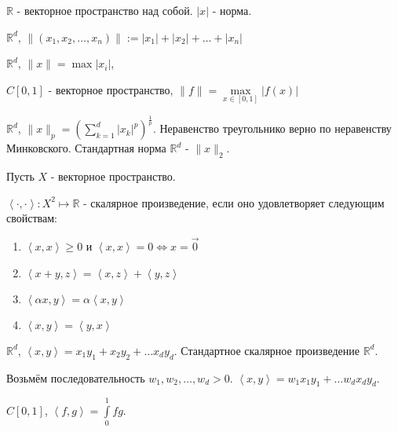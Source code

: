 \begin{example} \thmslashn

    $\mathbb{R}$ - векторное пространство над собой. $|x|$ - норма.

    $\mathbb{R}^{d}$, $\| (x_1, x_2, \ldots, x_{n})\| := |x_1| + |x_2| + \ldots + |x_n|$ 

    $\mathbb{R}^{d}$, $\|x\| = \max |x_{i}|$,

    $C[0, 1]$ - векторное пространство, $\|f\| = \max\limits_{x\in [0, 1]} |f(x)|$

    $\mathbb{R}^{d}$, $\| x \|_{p} = \left(\sum\limits_{k=1}^{d} |x_{k}|^{p}\right)^{\frac{1}{p}}$. Неравенство треугольнико верно по неравенству Минковского. Стандартная норма $\mathbb{R}^{d}$ - $\|x\|_{2}$.
\end{example}
\begin{definition} \thmslashn 

    Пусть $X$ - векторное пространство.

    $\left<\cdot , \cdot \right> : X^2 \mapsto \mathbb{R}$ - скалярное произведение, если оно удовлетворяет следующим свойствам:

    \begin{enumerate}
        \item $\left<x, x\right> \ge 0$ и $\left<x, x\right> = 0 \iff x = \vec{0}$
        \item $\left<x+y, z\right> = \left<x, z\right> + \left<y, z\right>$ 
        \item $\left<\alpha x, y\right> = \alpha\left<x, y\right>$
        \item $\left<x, y\right> = \left<y, x\right>$
    \end{enumerate}
\end{definition}
\begin{example} \thmslashn

    $\mathbb{R}^{d}$, $\left<x, y\right> = x_1y_1 + x_2y_2 + \ldots x_{d}y_{d}$. Стандартное скалярное произведение $\mathbb{R}^{d}$.

    Возьмём последовательность $w_1, w_2, \ldots, w_{d} > 0$. $\left<x, y\right> = w_1x_1y_1 + \ldots w_{d}x_{d}y_{d}$.

    $C[0, 1]$,  $\left<f, g\right> = \int\limits_{0}^{1} fg $.
\end{example}
